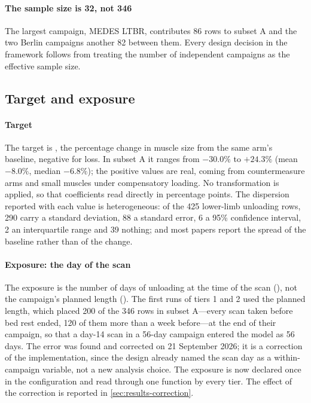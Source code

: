 \paragraph{The sample size is 32, not 346} The largest campaign, MEDES LTBR, contributes 86 rows to subset A and
the two Berlin campaigns another 82 between them. Every design decision in the framework follows from treating
the number of independent campaigns as the effective sample size.

\subsection{Target and exposure}
\label{sec:target}

\paragraph{Target} The target is , the percentage change in muscle size from the same arm's
baseline, negative for loss. In subset A it ranges from $-30.0\%$ to $+24.3\%$ (mean $-8.0\%$, median $-6.8\%$);
the positive values are real, coming from countermeasure arms and small muscles under compensatory loading. No
transformation is applied, so that coefficients read directly in percentage points. The dispersion reported with
each value is heterogeneous: of the 425 lower-limb unloading rows, 290 carry a standard deviation, 88 a standard
error, 6 a 95\% confidence interval, 2 an interquartile range and 39 nothing; and most papers report the spread
of the baseline rather than of the change.

\paragraph{Exposure: the day of the scan} The exposure is the number of days of unloading at the time of the scan
(), not the campaign's planned length (). The first runs of tiers 1 and
2 used the planned length, which placed 200 of the 346 rows in subset A---every scan taken before bed rest ended,
120 of them more than a week before---at the end of their campaign, so that a day-14 scan in a 56-day campaign
entered the model as 56 days. The error was found and corrected on 21 September 2026; it is a correction of the
implementation, since the design already named the scan day as a within-campaign variable, not a new analysis
choice. The exposure is now declared once in the configuration and read through one function by every tier. The
effect of the correction is reported in \cref{sec:results-correction}.

